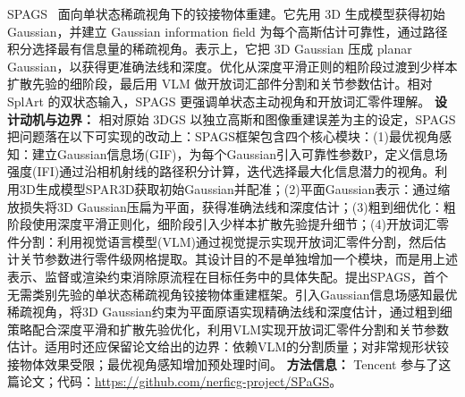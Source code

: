 SPAGS~\cite{2511_17092} 面向单状态稀疏视角下的铰接物体重建。它先用 3D 生成模型获得初始 Gaussian，并建立 Gaussian information field 为每个高斯估计可靠性，通过路径积分选择最有信息量的稀疏视角。表示上，它把 3D Gaussian 压成 planar Gaussian，以获得更准确法线和深度。优化从深度平滑正则的粗阶段过渡到少样本扩散先验的细阶段，最后用 VLM 做开放词汇部件分割和关节参数估计。相对 SplArt 的双状态输入，SPAGS 更强调单状态主动视角和开放词汇零件理解。
\textbf{设计动机与边界：} 相对原始 3DGS 以独立高斯和图像重建误差为主的设定，SPAGS 把问题落在以下可实现的改动上：SPAGS框架包含四个核心模块：(1)最优视角感知：建立Gaussian信息场(GIF)，为每个Gaussian引入可靠性参数P，定义信息场强度(IFI)通过沿相机射线的路径积分计算，迭代选择最大化信息潜力的视角。利用3D生成模型SPAR3D获取初始Gaussian并配准；(2)平面Gaussian表示：通过缩放损失将3D Gaussian压扁为平面，获得准确法线和深度估计；(3)粗到细优化：粗阶段使用深度平滑正则化，细阶段引入少样本扩散先验提升细节；(4)开放词汇零件分割：利用视觉语言模型(VLM)通过视觉提示实现开放词汇零件分割，然后估计关节参数进行零件级网格提取。其设计目的不是单独增加一个模块，而是用上述表示、监督或渲染约束消除原流程在目标任务中的具体失配。提出SPAGS，首个无需类别先验的单状态稀疏视角铰接物体重建框架。引入Gaussian信息场感知最优稀疏视角，将3D Gaussian约束为平面原语实现精确法线和深度估计，通过粗到细策略配合深度平滑和扩散先验优化，利用VLM实现开放词汇零件分割和关节参数估计。适用时还应保留论文给出的边界：依赖VLM的分割质量；对非常规形状铰接物体效果受限；最优视角感知增加预处理时间。
\textbf{方法信息：} Tencent 参与了这篇论文；代码：\url{https://github.com/nerficg-project/SPaGS}。



